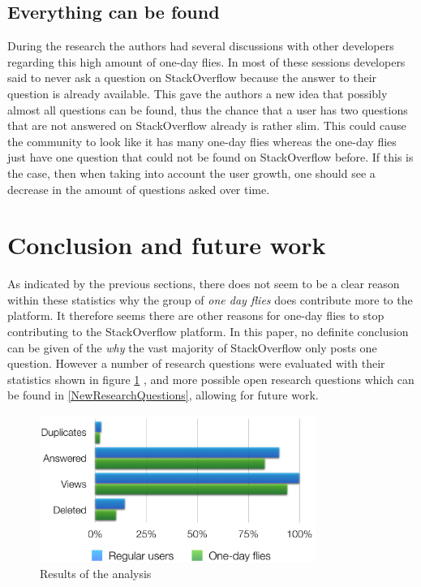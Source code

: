 \documentclass[conference]{IEEEtran}
\begin{document}
\subsection{Everything can be found}
During the research the authors had several discussions with other developers regarding this high amount of one-day flies. In most of these sessions developers said to never ask a question on StackOverflow because the answer to their question is already available. This gave the authors a new idea that possibly almost all questions can be found, thus the chance that a user has two questions that are not answered on StackOverflow already is rather slim. This could cause the community to look like it has many one-day flies whereas the one-day flies just have one question that could not be found on StackOverflow before. If this is the case, then when taking into account the user growth, one should see a decrease in the amount of questions asked over time. 

\section{Conclusion and future work}

As indicated by the previous sections, there does not seem to be a clear reason within these statistics why the group of \textit{one day flies} does contribute more to the platform. It therefore seems there are other reasons for one-day flies to stop contributing to the StackOverflow platform. In this paper, no definite conclusion can be given of the \textit{why} the vast majority of StackOverflow only posts one question. However a number of research questions were evaluated with their statistics shown in figure \ref{finalResults} , and more possible open research questions which can be found in \ref{NewResearchQuestions}, allowing for future work.

\begin{figure}[h]
 \includegraphics[width=9cm]{Plots/BarPlot.png}
 \caption{Results of the analysis}
 \label{finalResults}
\end{figure}
\end{document}

